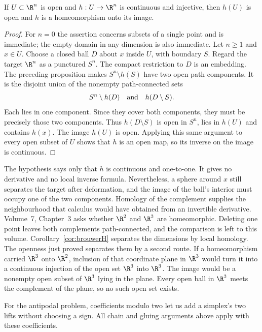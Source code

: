 \begin{theorem}\label{thm:invariancedomain}
If $U\subset\R^n$ is open and $h:U\to\R^n$ is continuous and injective, then $h(U)$ is open and $h$ is a homeomorphism onto its image.
\end{theorem}

\begin{proof}
For $n=0$ the assertion concerns subsets of a single point and is immediate; the empty domain in any dimension is also immediate. Let $n\ge1$ and $x\in U$. Choose a closed ball $D$ about $x$ inside $U$, with boundary $S$. Regard the target $\R^n$ as a punctured $S^n$. The compact restriction to $D$ is an embedding. The preceding proposition makes $S^n\setminus h(S)$ have two open path components. It is the disjoint union of the nonempty path-connected sets
\[
S^n\setminus h(D)\quad\hbox{and}\quad h(D\setminus S).
\]
Each lies in one component. Since they cover both components, they must be precisely those two components. Thus $h(D\setminus S)$ is open in $S^n$, lies in $h(U)$ and contains $h(x)$. The image $h(U)$ is open. Applying this same argument to every open subset of $U$ shows that $h$ is an open map, so its inverse on the image is continuous.
\end{proof}

\begin{beauty}
The hypothesis says only that $h$ is continuous and one-to-one. It gives no derivative and no local inverse formula. Nevertheless, a sphere around $x$ still separates the target after deformation, and the image of the ball's interior must occupy one of the two components. Homology of the complement supplies the neighbourhood that calculus would have obtained from an invertible derivative. Volume~7, Chapter~3 asks whether $\R^2$ and $\R^3$ are homeomorphic. Deleting one point leaves both complements path-connected, and the comparison is left to this volume. Corollary~\ref{cor:brouwerH} separates the dimensions by local homology. The openness just proved separates them by a second route. If a homeomorphism carried $\R^3$ onto $\R^2$, inclusion of that coordinate plane in $\R^3$ would turn it into a continuous injection of the open set $\R^3$ into $\R^3$. The image would be a nonempty open subset of $\R^3$ lying in the plane. Every open ball in $\R^3$ meets the complement of the plane, so no such open set exists.
\end{beauty}

For the antipodal problem, coefficients modulo two let us add a simplex's two lifts without choosing a sign. All chain and gluing arguments above apply with these coefficients.

